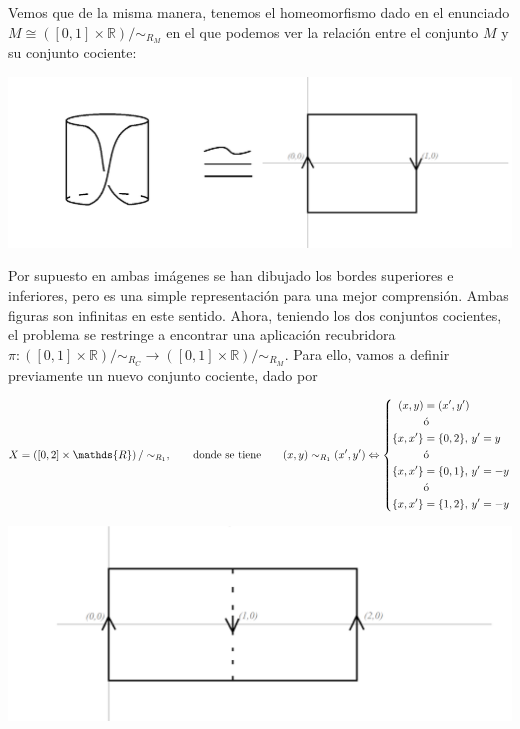 \documentclass[fleqn]{article}
\def\R{\mathds{R}}
\begin{document}
    Vemos que de la misma manera, tenemos el homeomorfismo dado en el enunciado $M \cong ([0,1] \times \R)/\sim_{R_M}$ en el que podemos ver la relación
    entre el conjunto $M$ y su conjunto cociente:
    
    \begin{center}
        \noindent
        \includegraphics[width=0.6\linewidth]{moebius.png}
    \end{center}

    Por supuesto en ambas imágenes se han dibujado los bordes superiores e inferiores, pero es una simple representación para una mejor comprensión. 
    Ambas figuras son infinitas en este sentido. Ahora, teniendo los dos conjuntos cocientes, el problema se restringe a encontrar una aplicación 
    recubridora $\pi: \left([0,1] \times \R\right) / \sim_{R_C}  \rightarrow  ([0,1] \times \R)/\sim_{R_M} $. Para ello, vamos a definir previamente 
    un nuevo conjunto cociente, dado por 

\newpage

    $$ X = \left([0,2] \times \R\right) / \sim_{R_1}, \quad \quad \text{donde se tiene} \quad \quad (x,y) \sim_{R_1} (x',y') \Leftrightarrow 
    \left\{ 
        \begin{aligned}
            (x,y) &= (x', y')\\
            &\text{ó}\\
            \{x,x'\} &= \{0,2\}, \thinspace y'=y\\
            &\text{ó}\\
            \{x,x'\} &= \{0,1\}, \thinspace y'=-y\\
            &\text{ó}\\
            \{x,x'\} &= \{1,2\}, \thinspace y'=-y
        \end{aligned}
    \right.$$

    \begin{center}
        \noindent
        \includegraphics[width=0.6\linewidth]{doble cilindro.png}
    \end{center}
    
\end{document}
